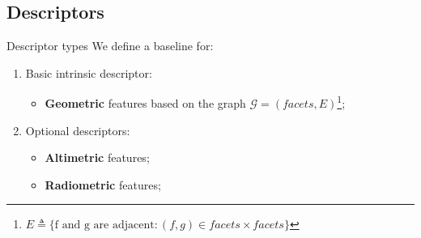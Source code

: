 \documentclass{beamer}
\begin{document}
        \subsection{Descriptors}
            \begin{frame}{Descriptor types}
                We define a baseline for:
                \begin{enumerate}[label = (\roman*)., font=\color{black}]
                    \item<1-> Basic intrinsic descriptor:
                    \begin{itemize}[label=$\blacktriangleright$, font=\color{IGNGreen}]
                        \item<2-> \textbf{Geometric} features based on the graph $\mathscr{G}=(facets, E)$\footnote{$E \triangleq \{\text{f and g are adjacent}: (f, g) \in facets \times facets\}$};
                    \end{itemize}
                    \item<3-> Optional descriptors:
                    \begin{itemize}[label=$\blacktriangleright$, font=\color{blue}]
                        \item<4-> \textbf{Altimetric} features;
                        \item<5-> \textbf{Radiometric} features;
                    \end{itemize}
                \end{enumerate}
            \end{frame}
\end{document}
